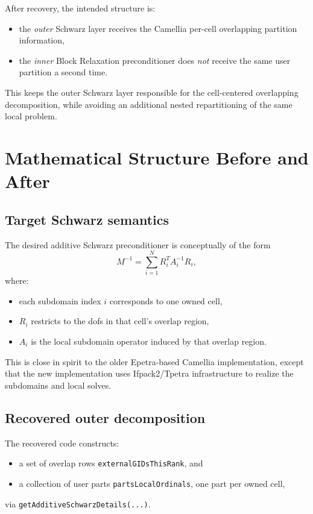 \documentclass[11pt]{article}
\begin{document}
After recovery, the intended structure is:
\begin{itemize}
  \item the \emph{outer} Schwarz layer receives the Camellia per-cell overlapping partition information,
  \item the \emph{inner} Block Relaxation preconditioner does \emph{not} receive the same user partition a second time.
\end{itemize}

This keeps the outer Schwarz layer responsible for the cell-centered overlapping decomposition, while avoiding an additional nested repartitioning of the same local problem.

\section{Mathematical Structure Before and After}

\subsection{Target Schwarz semantics}
The desired additive Schwarz preconditioner is conceptually of the form
\[
M^{-1} = \sum_{i=1}^N R_i^T A_i^{-1} R_i,
\]
where:
\begin{itemize}
  \item each subdomain index \(i\) corresponds to one owned cell,
  \item \(R_i\) restricts to the dofs in that cell's overlap region,
  \item \(A_i\) is the local subdomain operator induced by that overlap region.
\end{itemize}

This is close in spirit to the older Epetra-based Camellia implementation, except that the new implementation uses Ifpack2/Tpetra infrastructure to realize the subdomains and local solves.

\subsection{Recovered outer decomposition}
The recovered code constructs:
\begin{itemize}
  \item a set of overlap rows \texttt{externalGIDsThisRank}, and
  \item a collection of user parts \texttt{partsLocalOrdinals}, one part per owned cell,
\end{itemize}
via \texttt{getAdditiveSchwarzDetails(...)}.
\end{document}
